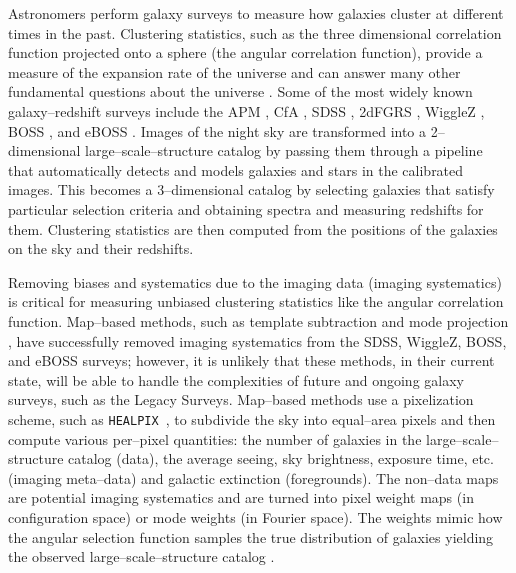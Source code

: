 \documentclass[a4paper,fleqn,usenatbib]{mnras}
\newcommand{\healpix}{{\tt HEALPIX}}
\begin{document}
Astronomers perform galaxy surveys to measure how galaxies cluster at different times in the past. Clustering statistics, such as the three dimensional correlation function projected onto a sphere (the angular correlation function), provide a measure of the expansion rate of the universe and can answer many other fundamental questions about the universe \citep{peebles1980}. Some of the most widely known galaxy--redshift surveys include the APM \citep{apmSurvey}, CfA \citep{cfaOne, cfaTwo}, SDSS \citep{sdssYork}, 2dFGRS \citep{2dFGRS}, WiggleZ \citep{wigglezSurvey}, BOSS \citep{bossSurvey}, and eBOSS \citep{dawson15}. Images of the night sky are transformed into a 2--dimensional large--scale--structure catalog by passing them through a pipeline that automatically detects and models galaxies and stars in the calibrated images. This becomes a 3--dimensional catalog by selecting galaxies that satisfy particular selection criteria and obtaining spectra and measuring redshifts for them. Clustering statistics are then computed from the positions of the galaxies on the sky and their redshifts. 

Removing biases and systematics due to the imaging data (imaging systematics) is critical for measuring unbiased clustering statistics like the angular correlation function. Map--based methods, such as template subtraction and mode projection \citep{biasInTemplateMethod}, have successfully removed imaging systematics from the SDSS, WiggleZ, BOSS, and eBOSS surveys; however, it is unlikely that these methods, in their current state, will be able to handle the complexities of future and ongoing galaxy surveys, such as the Legacy Surveys. Map--based methods use a pixelization scheme, such as \healpix\, \citep{healpix}, to subdivide the sky into equal--area pixels and then compute various per--pixel quantities: the number of galaxies in the large--scale--structure catalog (data), the average seeing, sky brightness, exposure time, etc. (imaging meta--data) and galactic extinction (foregrounds). The non--data maps are potential imaging systematics and are turned into pixel weight maps (in configuration space) or mode weights (in Fourier space). The weights mimic how the angular selection function samples the true distribution of galaxies yielding the observed large--scale--structure catalog \citep{biasInTemplateMethod}.
\end{document}
